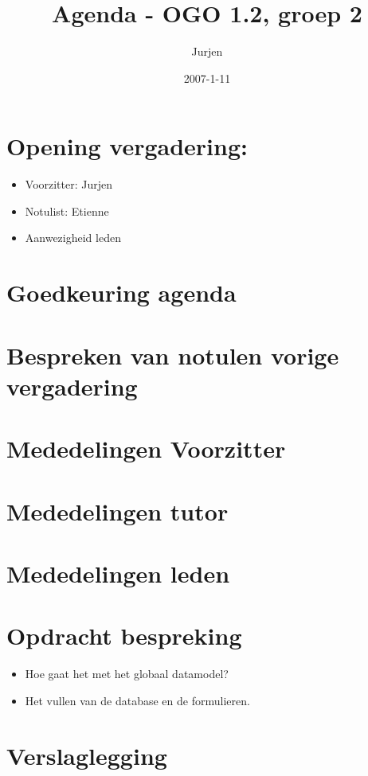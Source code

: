 \documentclass[]{article}
\title{Agenda - OGO 1.2, groep 2}
\author{Jurjen}
\date{2007-1-11}
\begin{document}
\maketitle


\section{Opening vergadering: }
  \begin{itemize}
    \item Voorzitter: Jurjen
    \item Notulist: Etienne
    \item Aanwezigheid leden
  \end{itemize}

\section{Goedkeuring agenda}

\section{Bespreken van notulen vorige vergadering}

\section{Mededelingen Voorzitter}

\section{Mededelingen tutor}

\section{Mededelingen leden}

\section{Opdracht bespreking}

   \begin{itemize}
      \item Hoe gaat het met het globaal datamodel?
      \item Het vullen van de database en de formulieren.
   \end{itemize}

\section{Verslaglegging}
\end{document}
